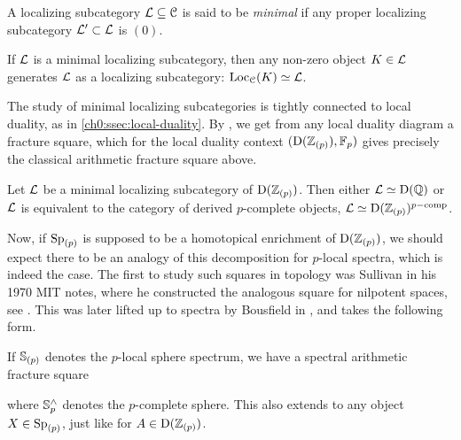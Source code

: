 \begin{definition}
    \label{ch0:def:minimal-localizing-subcategory}
    A localizing subcategory $\L\subseteq \C$ is said to be \emph{minimal} if any proper localizing subcategory $\L'\subset \L$ is $(0)$.  
\end{definition}

\begin{remark}
    If $\L$ is a minimal localizing subcategory, then any non-zero object $K\in \L$ generates $\L$ as a localizing subcategory: $\Loc_\C(K)\simeq \L$.
\end{remark}

The study of minimal localizing subcategories is tightly connected to local duality, as in \cref{ch0:ssec:local-duality}. By \cite[2.26]{barthel-heard-valenzuela_2018}, we get from any local duality diagram a fracture square, which for the local duality context $(\Der(\Z_{(p)}), \F_p)$ gives precisely the classical arithmetic fracture square above. 

\begin{proposition}
    Let $\L$ be a minimal localizing subcategory of $\Der(\Z_{(p)})$. Then either $\L \simeq \Der(\Q)$ or $\L$ is equivalent to the category of derived $p$-complete objects, $\L\simeq \Der(\Z_{(p)})^{p-\mathrm{comp}}$.
\end{proposition}

Now, if $\Sp_{(p)}$ is supposed to be a homotopical enrichment of $\Der(\Z_{(p)})$, we should expect there to be an analogy of this decomposition for $p$-local spectra, which is indeed the case. The first to study such squares in topology was Sullivan in his 1970 MIT notes, where he constructed the analogous square for nilpotent spaces, see \cite[3.20]{sullivan_05}. This was later lifted up to spectra by Bousfield in \cite[2.9]{bousfield_1979_localization}, and takes the following form. 

If $\S_{(p)}$ denotes the $p$-local sphere spectrum, we have a spectral arithmetic fracture square

\begin{center}
\end{center}

where $\S_p^\wedge$ denotes the $p$-complete sphere. This also extends to any object $X\in \Sp_{(p)}$, just like for $A\in \Der(\Z_{(p)})$. 

